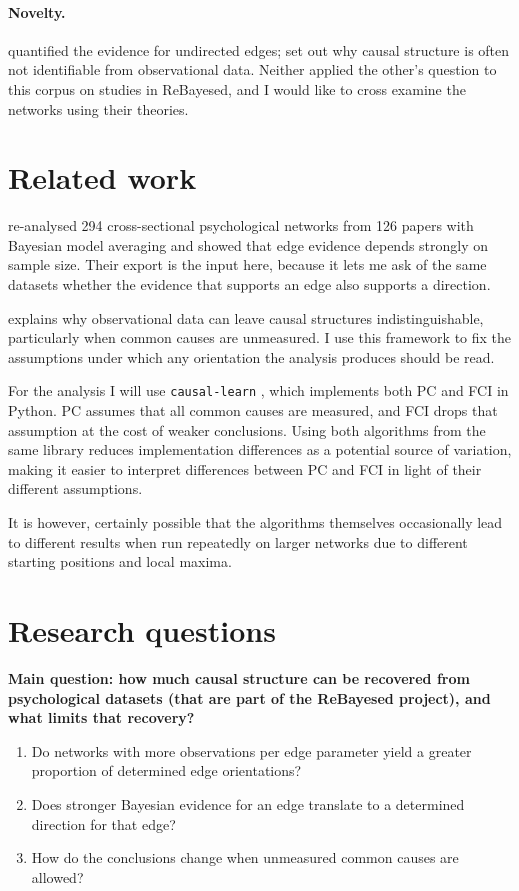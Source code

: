 \documentclass[a4paper]{article}
\begin{document}
\paragraph{Novelty.} \citet{huth2026} quantified the evidence for undirected edges;
\citet{huber2024} set out why causal structure is often not identifiable from
observational data. Neither applied the other's question to this corpus on studies in ReBayesed, and I would like to cross examine the networks using their theories.

\section{Related work}

\citet{huth2026} re-analysed 294 cross-sectional psychological networks from 126 papers
with Bayesian model averaging and showed that edge evidence depends strongly on sample
size. Their export is the input here, because it lets me ask of the same datasets
whether the evidence that supports an edge also supports a direction.

\citet{huber2024} explains why observational data can leave causal structures
indistinguishable, particularly when common causes are unmeasured. I use this framework
to fix the assumptions under which any orientation the analysis produces should be read.

For the analysis I will use \texttt{causal-learn} \citep{zheng2024}, which implements
both PC and FCI in Python. PC assumes that all common causes are measured, and FCI drops
that assumption at the cost of weaker conclusions. Using both algorithms from the same library reduces implementation differences as a potential source of variation, making it easier to interpret differences between PC and FCI in light of their different assumptions. 

It is however, certainly possible that the algorithms themselves occasionally lead to different results when run repeatedly on larger networks due to different starting positions and local maxima.

\section{Research questions}

\textbf{Main question: how much causal structure can be recovered from psychological datasets (that are part of the ReBayesed project), and what limits that recovery?}

\begin{enumerate}
\item Do networks with more observations per edge parameter yield a greater proportion of determined edge orientations?
\item Does stronger Bayesian evidence for an edge translate to a determined direction
for that edge?
\item How do the conclusions change when unmeasured common causes are allowed?
\end{enumerate}
\end{document}

